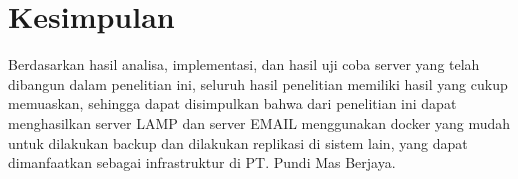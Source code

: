 \documentclass[./bab_5.tex]{subfiles}
\begin{document}
\section{Kesimpulan}
Berdasarkan hasil analisa, implementasi, dan hasil uji coba
server yang telah dibangun dalam penelitian ini, seluruh hasil
penelitian memiliki hasil yang cukup memuaskan, sehingga
dapat disimpulkan bahwa dari penelitian ini dapat menghasilkan
server LAMP dan server EMAIL menggunakan docker yang mudah
untuk dilakukan backup dan dilakukan replikasi di sistem
lain, yang dapat dimanfaatkan sebagai infrastruktur di PT.
Pundi Mas Berjaya.
\end{document}

